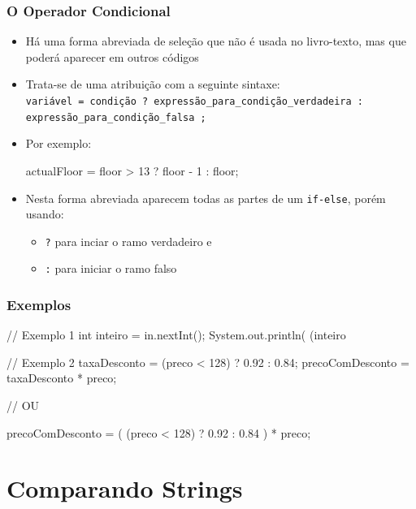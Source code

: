 \documentclass[xcolor={dvipsnames,table},aspectratio=169]{beamer}
\begin{document}
\begin{frame}[fragile]\frametitle{O Operador Condicional}
\begin{itemize}
	\item Há uma forma abreviada de seleção que não é usada no livro-texto, mas que poderá aparecer em outros códigos
	\item Trata-se de uma atribuição com a seguinte sintaxe:\\
	{\tiny \texttt{variável = condição ? expressão\_para\_condição\_verdadeira : expressão\_para\_condição\_falsa ;}}
	\item Por exemplo:
\begin{javacode}
actualFloor = floor > 13 ? floor - 1 : floor;
\end{javacode}
	\item Nesta forma abreviada aparecem todas as partes de um \texttt{if-else}, porém usando:
	\begin{itemize}
		\item \texttt{?} para inciar o ramo verdadeiro e
		\item \texttt{:} para iniciar o ramo falso
	\end{itemize}
\end{itemize}
\end{frame}

\begin{frame}[fragile]\frametitle{Exemplos}
\begin{javacode}
// Exemplo 1
int inteiro = in.nextInt();
System.out.println( (inteiro%

// Exemplo 2
taxaDesconto = (preco < 128) ? 0.92 : 0.84;
precoComDesconto = taxaDesconto * preco;

// OU

precoComDesconto = ( (preco < 128) ? 0.92 : 0.84 ) * preco;
\end{javacode}
\end{frame}

\section{Comparando Strings}
\end{document}
